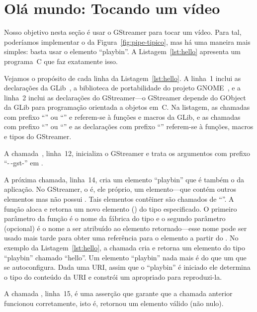 \documentclass{SBCbookchapter}
\begin{document}

\section{Olá mundo: Tocando um vídeo}
\label{sec:hello}

Nosso objetivo nesta seção é usar o GStreamer para tocar um vídeo.  Para
tal, poderíamos implementar o  da Figura~\ref{fig:pipe-tipico},
mas há uma maneira mais simples: basta usar o elemento ``playbin''.
A Listagem~\ref{lst:hello} apresenta um programa~C que faz exatamente isso.



Vejamos o propósito de cada linha da Listagem~\ref{lst:hello}.  A linha~1
inclui as declarações da GLib~\cite{glib}, a biblioteca de portabilidade do
projeto GNOME~\cite{gnome}, e a linha~2 inclui as declarações do
GStreamer---o GStreamer depende do  GObject~\cite{gobject} da
GLib para programação orientada a objetos em~C\null.  Na listagem, as
chamadas com prefixo ``'' ou ``'' e referem-se à funções e
macros da GLib, e as chamadas com prefixo ``'' ou ``'' e as
declarações com prefixo ``'' referem-se à funções, macros e tipos do
GStreamer.

A chamada~, linha~12, inicializa o GStreamer e trata os
argumentos com prefixo ``-\,-gst-'' em .

A próxima chamada, linha~14, cria um elemento ``playbin'' que é também o
 da aplicação.  No GStreamer, o  é, ele próprio,
um elemento---que contém outros elementos mas não possui .  Tais
elementos contêiner são chamados de ``''.  A função
 aloca e retorna um novo elemento
() do tipo especificado.  O primeiro parâmetro da função é o
nome da fábrica do tipo e o segundo parâmetro (opcional) é o nome a ser
atribuído ao elemento retornado---esse nome pode ser usado mais tarde para
obter uma referência para o elemento a partir do .  No exemplo
da Listagem~\ref{lst:hello}, a chamada cria e retorna um elemento do tipo
``playbin'' chamado ``hello''.  Um elemento ``playbin'' nada mais é do que
um  que se autoconfigura.  Dada uma URI, assim que o
``playbin'' é iniciado ele determina o tipo do conteúdo da URI e constrói um
 apropriado para reproduzi-la.

A chamada , linha~15, é uma asserção que garante que a
chamada anterior funcionou corretamente, isto é, retornou um elemento válido
(não nulo).
\end{document}
